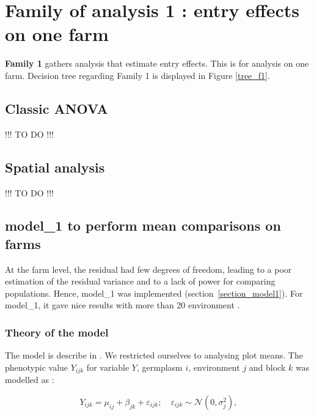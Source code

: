\documentclass{book}\usepackage[]{graphicx}\usepackage[]{color}
\begin{document}
\newpage


\section{Family of analysis 1 : entry effects on one farm}
\label{section_analysis1}

\textbf{Family 1} gathers analysis that estimate entry effects. This is for analysis on one farm.
Decision tree regarding Family 1 is displayed in Figure \ref{tree_f1}.


\subsection{Classic ANOVA}
\label{classic_anova}

!!! TO DO !!!

\newpage


\subsection{Spatial analysis}
\label{spatial_analysis}


!!! TO DO !!!

\newpage


\subsection{model\_1 to perform mean comparisons on farms }
\label{model_1}

At the farm level, the residual had few degrees of freedom, leading to a poor estimation of the residual variance and to a lack of power for comparing populations.
Hence, model\_1 was implemented (section~\ref{section_model1}).
For model\_1, it gave nice results with more than 20 environment \citep{riviere_hierarchical_2015}.

\subsubsection{Theory of the model}

The model is describe in \citet{riviere_hierarchical_2015}.
We restricted ourselves to analysing plot means.
The phenotypic value $Y_{ijk}$ for variable $Y$, germplasm $i$, environment $j$ and block $k$ was modelled as :

\begin{equation}
	Y_{ijk} = \mu_{ij} + \beta_{jk} + \varepsilon_{ijk} ; \quad \varepsilon_{ijk} \sim \mathcal{N} (0,\sigma^2_{j}),
	\label{model1}
\end{equation}
\end{document}
